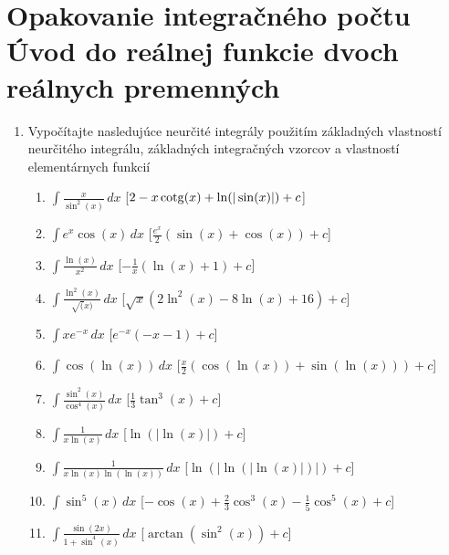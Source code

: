 

\section{Opakovanie integračného počtu \\ Úvod do reálnej funkcie dvoch reálnych premenných}


\begin{enumerate}

\item Vypočítajte nasledujúce neurčité integrály použitím základných vlastností neurčitého integrálu, základných integračných vzorcov a vlastností elementárnych funkcií
\begin{enumerate}
\item{$ \int \frac{x}{\sin^2(x)} \,dx$} \hspace{\fill} [$2-x\operatorname{cotg}(x)+\ln(|\sin(x)|)+c$]
\item{$ \int e^x\cos(x) \,dx$} \hspace{\fill} [$\frac{e^x}{2}(\sin(x)+\cos(x)) +c$]
\item{$ \int \frac{\ln(x)}{x^2} \,dx$} \hspace{\fill} [$-\frac{1}{x}(\ln(x)+1) +c$]
\item{$ \int \frac{\ln^2(x)}{\sqrt(x)} \,dx$} \hspace{\fill} [$\sqrt{x}(2\ln^2(x)-8\ln(x)+16) +c$]
\item{$ \int x e^{-x} \,dx$} \hspace{\fill} [$e^{-x}(-x-1) +c$]
\item{$ \int \cos(\ln(x)) \,dx$} \hspace{\fill} [$\frac{x}{2}(\cos(\ln(x))+\sin(\ln(x)))+c$]

\item{$ \int \frac{\sin^2(x)}{\cos^4(x)} \,dx$} \hspace{\fill} [$\frac{1}{3}\tan^3(x)+c$]

\item{$ \int \frac{1}{x\ln(x)} \,dx$} \hspace{\fill} [$\ln(|\ln(x)|)+c$]

\item{$ \int \frac{1}{x\ln(x)\ln(\ln(x))} \,dx$} \hspace{\fill} [$\ln(|\ln(|\ln(x)|)|)+c$]

\item{$ \int \sin^5(x) \,dx$} \hspace{\fill} [$-\cos(x)+\frac{2}{3}\cos^3(x)-\frac{1}{5}\cos^5(x)+c$]
\item{$ \int \frac{\sin(2x)}{1+\sin^4(x)} \,dx$} \hspace{\fill} [$\arctan(\sin^2(x))+c$]
\end{enumerate}



\end{enumerate}
